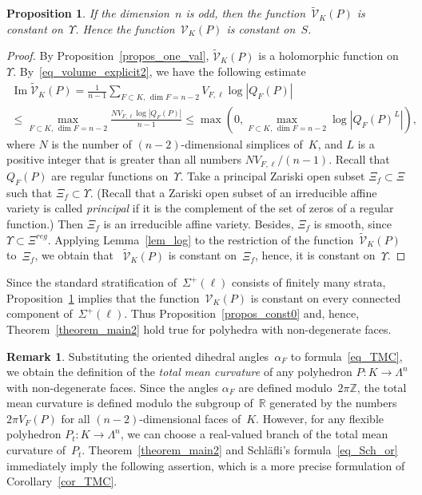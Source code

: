 \documentclass[reqno,tbtags,12pt]{amsart}
\numberwithin{equation}{section}
\newcommand{\R}{\mathbb{R}}
\newcommand{\Z}{\mathbb{Z}}
\newcommand{\CV}{\mathcal{V}}
\newcommand{\tCV}{\widetilde{\mathcal{V}}}
\newcommand{\bell}{\boldsymbol{\ell}}
\renewcommand{\Im}{\mathop{\mathrm{Im}}\nolimits}
\newtheorem{propos}[theorem]{Proposition}
\theoremstyle{definition}
\newtheorem{remark}[theorem]{Remark}
\begin{document}
\begin{propos}\label{propos_const1}
If the dimension~$n$ is odd, then the function~$\tCV_K(P)$ is constant on~$\Upsilon$. Hence the function~$\CV_K(P)$ is constant on~$S$.
\end{propos}

\begin{proof}
By Proposition~\ref{propos_one_val}, $\tCV_K( P)$ is a holomorphic function on~$\Upsilon$.
By~\eqref{eq_volume_explicit2}, we have the following estimate 
\begin{multline*}
\Im\tCV_K( P)=\frac{1}{n-1}\sum_{F\subset K,\,\dim F=n-2}V_{F,\bell}\log|Q_F( P)|\\
\le \max_{F\subset K,\,\dim F=n-2}\frac{NV_{F,\bell}\log|Q_F( P)|}{n-1}
{}\le\max\left(0, 
\max_{F\subset K,\,\dim F=n-2}\log\left|Q_F( P)^L\right|\right),
\end{multline*}
where $N$ is the number of $(n-2)$-dimensional simplices of~$K$, and $L$ is a positive integer that is greater than all numbers $NV_{F,\bell}/(n-1)$.
Recall that $Q_F( P)$ are regular functions on~$\Upsilon$. Take a principal Zariski open subset $\Xi_f\subset\Xi$ such that $\Xi_f\subset\Upsilon$.  (Recall that a Zariski open subset of an irreducible affine variety is called \textit{principal\/} if it is the complement of the set of zeros of a regular function.) Then  $\Xi_f$ is an irreducible affine variety. Besides, $\Xi_f$ is smooth, since $\Upsilon\subset\Xi^{reg}$. Applying Lemma~\ref{lem_log} to the restriction of the function~$\tCV_K( P)$ to~$\Xi_f$, we obtain that ~$\tCV_K( P)$ is  constant on~$\Xi_f$, hence, it is constant on~$\Upsilon$. 
\end{proof}

Since the standard stratification of~$\Sigma^+(\bell)$ consists of finitely many strata, Proposition~\ref{propos_const1} implies that the function~$\CV_K(P)$ is constant on every connected component of~$\Sigma^+(\bell)$. Thus Proposition~\ref{propos_const0} and, hence, Theorem~\ref{theorem_main2} hold true for polyhedra with non-degenerate faces.

\begin{remark}\label{remark_TMC}
Substituting the oriented dihedral angles~$\alpha_F$ to formula~\eqref{eq_TMC}, we obtain the definition of the \textit{total mean curvature\/} of any polyhedron $P\colon K\to\Lambda^n$ with non-degenerate faces. Since the angles $\alpha_F$ are defined modulo~$2\pi\Z$, the total mean curvature is defined modulo the subgroup of~$\R$ generated by the numbers $2\pi V_F(P)$ for all $(n-2)$-dimensional faces of~$K$. However, for any flexible polyhedron $P_t\colon K\to\Lambda^n$, we can choose a real-valued branch of the total mean curvature of~$P_t$. Theorem~\ref{theorem_main2} and Schl\"afli's formula~\eqref{eq_Sch_or} immediately imply the following assertion, which is a more precise formulation of Corollary~\ref{cor_TMC}. 
\end{remark}
\end{document}
